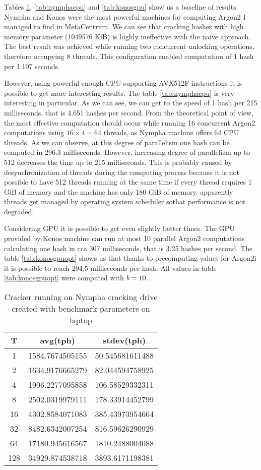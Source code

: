 \documentclass[nolof]{fithesis3}
\begin{document}
Tables \ref{tab:nymphacracker}, \ref{tab:nymphacpu}  and \ref{tab:konosgpu} show us a baseline of results. Nympha and Konos were the most powerful machines for computing Argon2 I managed to find in MetaCentrum. We can see that cracking hashes with high memory parameter (1049576 KiB) is highly ineffective with the naive approach. The best result was achieved while running two concurrent unlocking operations, therefore occupying 8 threads. This configuration enabled computation of 1 hash per 1.107 seconds.

However, using powerful enough CPU supporting AVX512F instructions it is possible to get more interesting results. The table \ref{tab:nymphacpu} is very interesting in particular. As we can see, we can get to the speed of 1 hash per 215 milliseconds, that is 4.651 hashes per second. From the theoretical point of view, the most effective computation should occur while running 16 concurrent Argon2 computations using $16 \times 4 = 64$ threads, as Nympha machine offers 64 CPU threads. As we can observe, at this degree of parallelism one hash can be computed in 296.3 milliseconds. However, increasing degree of parallelism up to 512 decreases the time up to 215 milliseconds. This is probably caused by desynchronization of threads during the computing process because it is not possible to have 512 threads running at the same time if every thread requires 1 GiB of memory and the machine has only 180 GiB of memory. apparently threads get managed by operating system scheduler sothat performance is not degraded.

Considering GPU it is possible to get even slightly better times. The GPU provided by Konos machine can run at most 10 parallel Argon2 computations calculating one hash in cca 307 milliseconds, that is 3.25 hashes per second. The table \ref{tab:konosgpuopt} shows us that thanks to precomputing values for Argon2i it is possible to reach 294.5 milliseconds per hash. All values in table \ref{tab:konosgpuopt} were computed with $\emph{b} = 10$.

\noindent
\begin{table}
\caption{Cracker running on Nympha cracking drive created with benchmark parameters on laptop}
\label{tab:nymphacracker}
\begin{tabularx}{\textwidth}{| c | c | c |}
\hline
T & avg(tph) & stdev(tph)\\
\hline
1 & 1584.7674505155 & 50.545681611488\\
\hline
2 & 1634.9176665279 & 82.044594758925\\
\hline
4 & 1906.2277095858 & 106.58529332311\\
\hline
8 & 2502.0319979111 & 178.33914452799\\
\hline
16 & 4302.8584071083 & 385.43973954664\\
\hline
32 & 8482.6342007254 & 816.59626290929\\
\hline
64 & 17180.945616567 & 1810.2488004088\\
\hline
128 & 34929.874538718 & 3893.6171198381\\
\hline
\end{tabularx}
\end{table}
\end{document}

